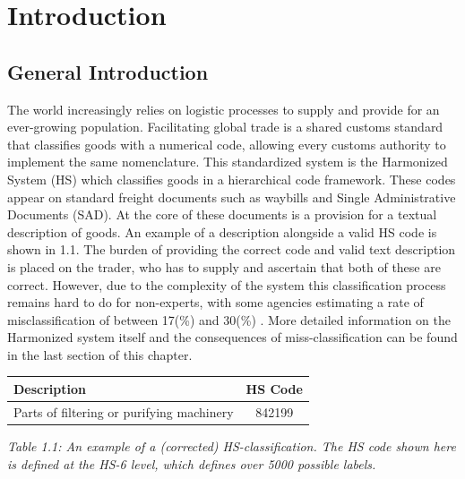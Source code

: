\UseRawInputEncoding
\chapter{Introduction}\label{ch:intro}
\section{General Introduction}
The world increasingly relies on logistic processes to supply and provide for
an ever-growing population. Facilitating global trade is a shared customs
standard that classifies goods with a numerical code, allowing every customs
authority to implement the same nomenclature. This standardized
system is the Harmonized System (HS) which classifies goods in a hierarchical
code framework. These codes appear on standard freight documents
such as waybills and Single Administrative Documents (SAD). At the core
of these documents is a provision for a textual description of goods. An
example of a description alongside a valid HS code is shown in 1.1. The
burden of providing the correct code and valid text description is placed
on the trader, who has to supply and ascertain that both of these are correct.
However, due to the complexity of the system this classification process
remains hard to do for non-experts, with some agencies estimating a rate of
misclassification of between 17(\%) and 30(\%) \cite{OfficeoftheAuditorGeneralofCanadaGovernmentofCanada.2010}. More detailed information
on the Harmonized system itself and the consequences of miss-classification
can be found in the last section of this chapter. \\

\begin{center}
    \begin{tabular}{lc} \hline \centering
Description & HS Code \\ \hline
Parts of filtering or purifying machinery & 842199 \\ \hline
	\end{tabular}
\end{center}
{\textit{Table 1.1: An example of a (corrected) HS-classification. The HS code shown here is defined at the HS-6 level, which defines over 5000 possible labels.}} \\

